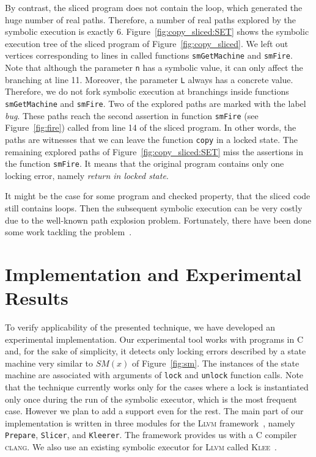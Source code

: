 \documentclass[10pt]{llncs}
\newcommand\Color[2]{\textcolor{#1}{#2}}
\newcommand{\SM}{{\textit{SM}}}
\newcommand\bluetext[1]{{\Color{blue}{#1}}}
\renewcommand\bluetext[1]{#1}
\begin{document}
By contrast, the sliced program does not contain the loop, which generated
the huge number of real paths. Therefore, a number of real paths explored by
the symbolic execution is exactly 6. Figure~\ref{fig:copy_sliced:SET} shows
the symbolic execution tree of the sliced program of
Figure~\ref{fig:copy_sliced}. We left out vertices corresponding to lines in
called functions \texttt{smGetMachine} and \texttt{smFire}. Note that
although the parameter \texttt{n} has a symbolic value, it can only affect
the branching at line 11. Moreover, the parameter \texttt{L} always has a
concrete value. Therefore, we do not fork symbolic execution at branchings
inside functions \texttt{smGetMachine} and \texttt{smFire}. Two of the
explored paths are marked with the label \emph{bug}. These paths reach the
second assertion in function \texttt{smFire} (see Figure~\ref{fig:fire})
called from line 14 of the sliced program. In other words, the paths are
witnesses that we can leave the function \texttt{copy} in a locked
state. The remaining explored paths of Figure~\ref{fig:copy_sliced:SET} miss
the assertions in the function \texttt{smFire}. It means that the original
program contains only one locking error, namely \emph{return in locked
  state}.

\bluetext{
It might be the case for some program and checked property, that the sliced
code still contains loops. Then the subsequent symbolic execution can be very
costly due to the well-known path explosion problem. Fortunately, there have
been done some work tackling the
problem~\cite{G07,GKL08,GNRT10,SPmCS09,XGM08}.
}



\section{Implementation and Experimental Results}
\label{sec:impl}
To verify applicability of the presented technique, we have developed an
experimental implementation. Our experimental tool works with programs in C
and, for the sake of simplicity, it detects only locking errors described by
a state machine very similar to $\SM(x)$ of Figure~\ref{fig:sm}. The instances
of the state machine are associated with arguments of \texttt{lock} and
\texttt{unlock} function calls. Note that the technique currently works only
for the cases where a lock is instantiated only once during the run of the
symbolic executor, which is the most frequent case. However we
plan to add a support even for the rest. The main part of our implementation
is written in three modules for the \textsc{Llvm} framework~\cite{llvm},
namely \texttt{Prepare}, \texttt{Slicer}, and \texttt{Kleerer}. The framework
provides us with a C compiler \textsc{\textsc{clang}}. We also use an
existing symbolic executor for \textsc{Llvm} called \textsc{Klee}~\cite{klee}.
\end{document}
